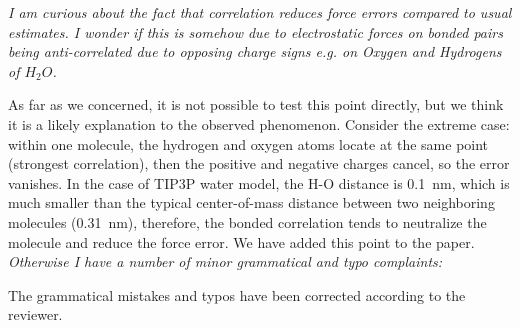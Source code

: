 \documentclass[a4paper]{article}
\begin{document}



\textit{
I am curious about the fact that correlation reduces force errors
compared to usual estimates. I wonder if this is somehow due to
electrostatic forces on bonded pairs being anti-correlated due to
opposing charge signs e.g. on Oxygen and Hydrogens of $H_2O$.
}

As far as we concerned, it is not possible to test this point
directly, but we think it is a likely explanation to the observed
phenomenon.  Consider the extreme case: within one molecule, the
hydrogen and oxygen atoms locate at the same point (strongest
correlation), then the positive and negative charges cancel, so the
error vanishes. In the case of TIP3P water model, the H-O distance is 0.1~nm,
which is much smaller than the typical
center-of-mass distance between two neighboring molecules (0.31~nm),
therefore, the bonded correlation tends to neutralize the molecule
and reduce the force error.
We have added this point to the paper.
\\

\textit{
Otherwise I have a number of minor grammatical and typo complaints:
}

The grammatical mistakes and typos have been corrected according to the reviewer.
\end{document}
